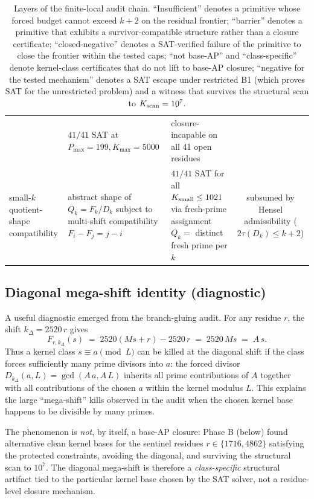 \begin{table}[h]
\begin{tabular}{lllc}
        & $41 / 41$ SAT at $P_{\max} = 199, K_{\max} = 5000$
        & closure-incapable on all 41 open residues \\
small-$k$ quotient-shape compatibility
        & abstract shape of $Q_k = F_k / D_k$ subject to
          multi-shift compatibility $F_i - F_j = j - i$
        & $41 / 41$ SAT for all $K_{\rm small} \le 1021$ via fresh-prime
          assignment $Q_k =$ distinct fresh prime per $k$
        & subsumed by Hensel admissibility ($2\tau(D_k) \le k+2$) \\
\bottomrule
\end{tabular}
\caption{Layers of the finite-local audit chain. ``Insufficient''
denotes a primitive whose forced budget cannot exceed $k+2$ on the
residual frontier; ``barrier'' denotes a primitive that exhibits a
survivor-compatible structure rather than a closure certificate;
``closed-negative'' denotes a SAT-verified failure of the primitive
to close the frontier within the tested caps; ``not base-AP'' and
``class-specific'' denote kernel-class certificates that do not lift
to base-AP closure; ``negative for the tested mechanism'' denotes a
SAT escape under restricted B1 (which proves SAT for the unrestricted
problem) and a witness that survives the structural scan to $K_{\rm scan} = 10^7$.}
\label{tab:audit-summary}
\end{table}

\subsection{Diagonal mega-shift identity (diagnostic)}
\label{sec:diagonal-megashift}

A useful diagnostic emerged from the branch-gluing audit. For any
residue $r$, the shift $k_\Delta = 2520\, r$ gives
\[
F_{r, k_\Delta}(s)
\;=\; 2520(M s + r) - 2520\, r
\;=\; 2520\, M s
\;=\; A\, s.
\]
Thus a kernel class $s \equiv a \pmod{L}$ can be killed at the
diagonal shift if the class forces sufficiently many prime divisors
into $a$: the forced divisor $D_{k_\Delta}(a, L) = \gcd(A\, a, A\, L)$
inherits all prime contributions of $A$ together with all
contributions of the chosen $a$ within the kernel modulus $L$. This
explains the large ``mega-shift'' kills observed in the audit when
the chosen kernel base happens to be divisible by many primes.

The phenomenon is \emph{not}, by itself, a base-AP closure: Phase B
(below) found alternative clean kernel bases for the sentinel
residues $r \in \{1716, 4862\}$ satisfying the protected
constraints, avoiding the diagonal, and surviving the structural
scan to $10^7$. The diagonal mega-shift is therefore a
\emph{class-specific} structural artifact tied to the particular
kernel base chosen by the SAT solver, not a residue-level closure
mechanism.


